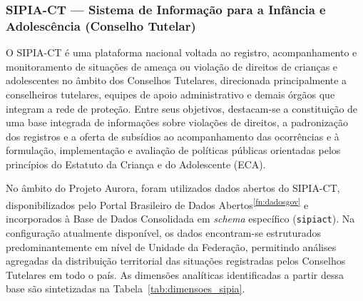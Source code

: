 \documentclass[11pt,a4paper]{article}
\begin{document}
\subsubsection{SIPIA-CT — Sistema de Informação para a Infância e Adolescência (Conselho Tutelar)}
\label{subsubsec:sipiact_atividade}

O SIPIA-CT é uma plataforma nacional voltada ao registro, acompanhamento e monitoramento de situações de ameaça ou violação de direitos de crianças e adolescentes no âmbito dos Conselhos Tutelares, direcionada principalmente a conselheiros tutelares, equipes de apoio administrativo e demais órgãos que integram a rede de proteção. Entre seus objetivos, destacam-se a constituição de uma base integrada de informações sobre violações de direitos, a padronização dos registros e a oferta de subsídios ao acompanhamento das ocorrências e à formulação, implementação e avaliação de políticas públicas orientadas pelos princípios do Estatuto da Criança e do Adolescente (ECA).

No âmbito do Projeto Aurora, foram utilizados dados abertos do SIPIA-CT, disponibilizados pelo Portal Brasileiro de Dados Abertos\textsuperscript{\ref{fn:dadosgov}} e incorporados à Base de Dados Consolidada em \emph{schema} específico (\texttt{sipiact}). Na configuração atualmente disponível, os dados encontram-se estruturados predominantemente em nível de Unidade da Federação, permitindo análises agregadas da distribuição territorial das situações registradas pelos Conselhos Tutelares em todo o país. As dimensões analíticas identificadas a partir dessa base são sintetizadas na Tabela~\ref{tab:dimensoes_sipia}.
\end{document}
